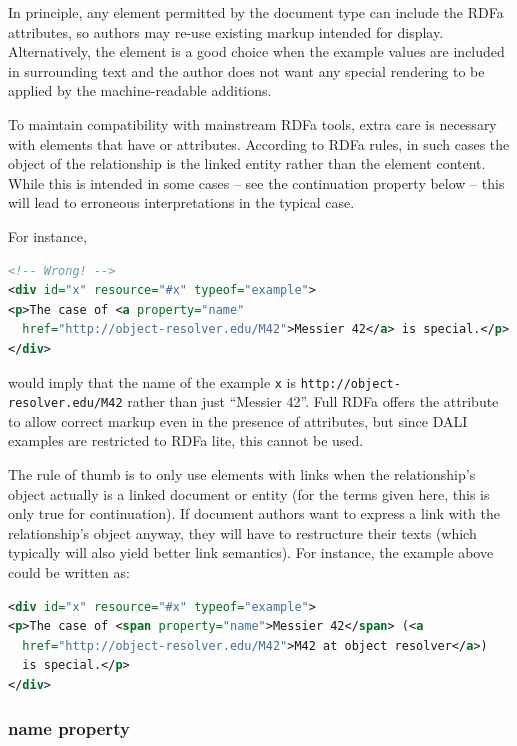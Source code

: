 \documentclass[11pt,letter]{ivoa}
\begin{document}
In principle, any element permitted by the document type can include the RDFa
attributes, so authors may re-use existing markup intended for display.
Alternatively, the  element is a good choice when the example values are
included in surrounding text and the author does not want any special rendering
to be applied by the machine-readable additions.

To maintain compatibility with mainstream RDFa tools, extra care is
necessary with elements that have  or 
attributes.  According to RDFa rules, in such cases the object of the
relationship is the linked entity rather than the element content.
While this is intended in some cases -- see the continuation property
below -- this will lead to erroneous interpretations in the typical
case.

For instance,

\begin{lstlisting}[language=XML]
<!-- Wrong! -->
<div id="x" resource="#x" typeof="example">
<p>The case of <a property="name"
  href="http://object-resolver.edu/M42">Messier 42</a> is special.</p>
</div>
\end{lstlisting}

\noindent
would imply that the name of the example \texttt{x} is
\nolinkurl{http://object-resolver.edu/M42} rather than just ``Messier
42''.  Full RDFa offers the  attribute to allow correct
markup even in the presence of  attributes, but since DALI
examples are restricted to RDFa lite, this cannot be used.

The rule of thumb is to only use elements with links when the
relationship's object actually is a linked document or entity (for the
terms given here, this is only true for continuation).  If document
authors want to express a link with the relationship's object anyway,
they will have to restructure their texts (which typically will also
yield better link semantics).  For instance, the example above could be
written as:

\begin{lstlisting}[language=XML]
<div id="x" resource="#x" typeof="example">
<p>The case of <span property="name">Messier 42</span> (<a
  href="http://object-resolver.edu/M42">M42 at object resolver</a>)
  is special.</p>
</div>
\end{lstlisting}

\subsubsection{name property}
\end{document}
